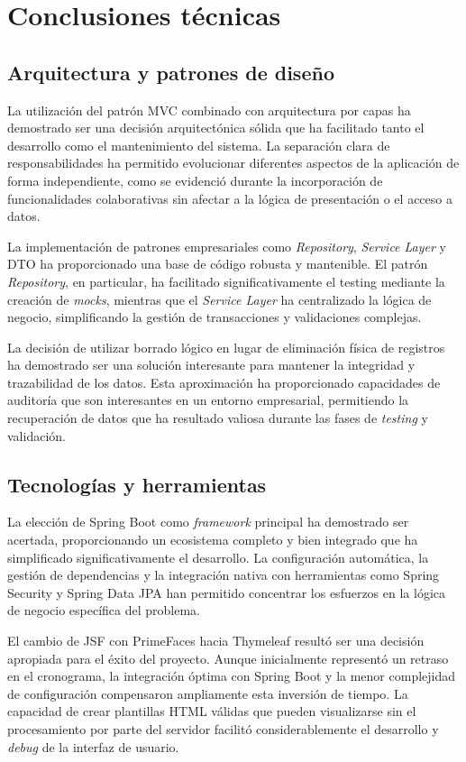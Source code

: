 \section{Conclusiones técnicas}\label{conclusiones-tecncicas}
\subsection{Arquitectura y patrones de diseño}\label{arquitectura-patrones-diseño}
La utilización del patrón MVC combinado con arquitectura por capas ha demostrado ser una decisión arquitectónica sólida que ha facilitado tanto el desarrollo como el mantenimiento del sistema. La separación clara de responsabilidades ha permitido evolucionar diferentes aspectos de la aplicación de forma independiente, como se evidenció durante la incorporación de funcionalidades colaborativas sin afectar a la lógica de presentación o el acceso a datos.

La implementación de patrones empresariales como \emph{Repository}, \emph{Service Layer} y DTO ha proporcionado una base de código robusta y mantenible. El patrón \emph{Repository}, en particular, ha facilitado significativamente el testing mediante la creación de \emph{mocks}, mientras que el \emph{Service Layer} ha centralizado la lógica de negocio, simplificando la gestión de transacciones y validaciones complejas.

La decisión de utilizar borrado lógico en lugar de eliminación física de registros ha demostrado ser una solución interesante para mantener la integridad y trazabilidad de los datos. Esta aproximación ha proporcionado capacidades de auditoría que son interesantes en un entorno empresarial, permitiendo la recuperación de datos que ha resultado valiosa durante las fases de \emph{testing} y validación.

\subsection{Tecnologías y herramientas}\label{tencologias-herramientas}
La elección de Spring Boot como \emph{framework} principal ha demostrado ser acertada, proporcionando un ecosistema completo y bien integrado que ha simplificado significativamente el desarrollo. La configuración automática, la gestión de dependencias y la integración nativa con herramientas como Spring Security y Spring Data JPA han permitido concentrar los esfuerzos en la lógica de negocio específica del problema.

El cambio de JSF con PrimeFaces hacia Thymeleaf resultó ser una decisión apropiada para el éxito del proyecto. Aunque inicialmente representó un retraso en el cronograma, la integración óptima con Spring Boot y la menor complejidad de configuración compensaron ampliamente esta inversión de tiempo. La capacidad de crear plantillas HTML válidas que pueden visualizarse sin el procesamiento por parte del servidor facilitó considerablemente el desarrollo y \emph{debug} de la interfaz de usuario.

